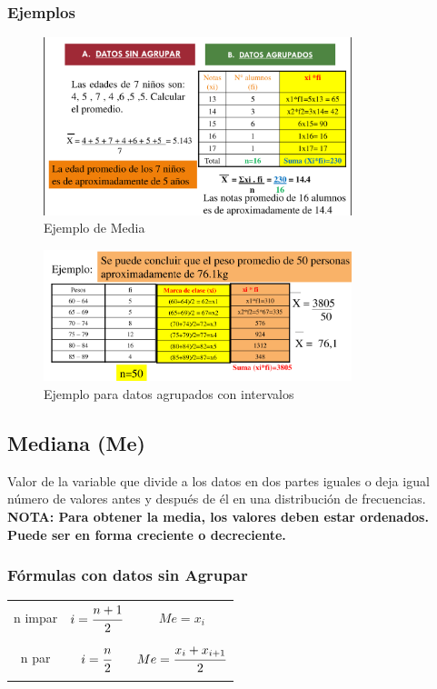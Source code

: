 \documentclass{article}
\begin{document}
        \subsubsection{Ejemplos}
            \begin{figure}[h!]
                \centering
                \includegraphics[width=0.8\textwidth]{img/media1.png}
                \caption{Ejemplo de Media}
            \end{figure}
            \begin{figure}[h!]
                \centering
                \includegraphics[width=0.8\textwidth]{img/media2.png}
                \caption{Ejemplo para datos agrupados con intervalos}
            \end{figure}
    \subsection{Mediana (Me)}
        Valor de la variable que divide a los datos en dos partes iguales o deja igual número de valores antes y después de él en una distribución de frecuencias.
        \textbf{NOTA: Para obtener la media, los valores deben estar ordenados. Puede ser en forma creciente o decreciente.}
        \subsubsection{Fórmulas con datos sin Agrupar}
        \begin{table}[H]
            \centering
            \begin{tabular}{|c|c|c|}
                \hline
                n impar& $ i = \cfrac{n+1}{2}$&$ Me = x_i$ \\ &&\\ \hline 
                n par  & $i = \cfrac{n}{2}$&$ Me = \cfrac{x_i + x_{i+1}}{2}$ \\ &&\\ 
                \hline
            \end{tabular}
        \end{table}
\end{document}
